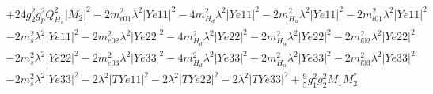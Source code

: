 \begin{align}
 &+24 g_{2}^{2} g_{p}^{2} Q_{H_u}^{2} |M_2|^2 -2 m^2_{e01} \lambda^{2} |Ye11|^2 -4 m_{H_d}^2 \lambda^{2} |Ye11|^2 -2 m_{H_u}^2 \lambda^{2} |Ye11|^2 -2 m^2_{l01} \lambda^{2} |Ye11|^2 \nonumber \\ 
 &-2 m^2_{s} \lambda^{2} |Ye11|^2 -2 m^2_{e02} \lambda^{2} |Ye22|^2 -4 m_{H_d}^2 \lambda^{2} |Ye22|^2 -2 m_{H_u}^2 \lambda^{2} |Ye22|^2 -2 m^2_{l02} \lambda^{2} |Ye22|^2 \nonumber \\ 
 &-2 m^2_{s} \lambda^{2} |Ye22|^2 -2 m^2_{e03} \lambda^{2} |Ye33|^2 -4 m_{H_d}^2 \lambda^{2} |Ye33|^2 -2 m_{H_u}^2 \lambda^{2} |Ye33|^2 -2 m^2_{l03} \lambda^{2} |Ye33|^2 \nonumber \\ 
 &-2 m^2_{s} \lambda^{2} |Ye33|^2 -2 \lambda^{2} |TYe11|^2 -2 \lambda^{2} |TYe22|^2 -2 \lambda^{2} |TYe33|^2 +\frac{9}{5} g_{1}^{2} g_{2}^{2} M_1 M_2^* \nonumber 
\end{align} 
